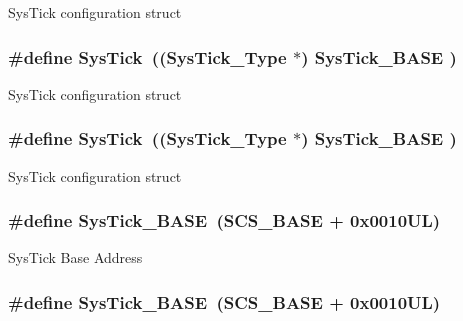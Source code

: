 Sys\-Tick configuration struct \hypertarget{group___c_m_s_i_s__core__register_gacd96c53beeaff8f603fcda425eb295de}{
\subsubsection[{Sys\-Tick}]{\setlength{\rightskip}{0pt plus 5cm}\#define Sys\-Tick~(({\bf Sys\-Tick\-\_\-\-Type}   $\ast$)     {\bf Sys\-Tick\-\_\-\-B\-A\-S\-E}  )}}\label{group___c_m_s_i_s__core__register_gacd96c53beeaff8f603fcda425eb295de}
Sys\-Tick configuration struct \hypertarget{group___c_m_s_i_s__core__register_gacd96c53beeaff8f603fcda425eb295de}{
\subsubsection[{Sys\-Tick}]{\setlength{\rightskip}{0pt plus 5cm}\#define Sys\-Tick~(({\bf Sys\-Tick\-\_\-\-Type}   $\ast$)     {\bf Sys\-Tick\-\_\-\-B\-A\-S\-E}  )}}\label{group___c_m_s_i_s__core__register_gacd96c53beeaff8f603fcda425eb295de}
Sys\-Tick configuration struct \hypertarget{group___c_m_s_i_s__core__register_ga58effaac0b93006b756d33209e814646}{
\subsubsection[{Sys\-Tick\-\_\-\-B\-A\-S\-E}]{\setlength{\rightskip}{0pt plus 5cm}\#define Sys\-Tick\-\_\-\-B\-A\-S\-E~({\bf S\-C\-S\-\_\-\-B\-A\-S\-E} +  0x0010\-U\-L)}}\label{group___c_m_s_i_s__core__register_ga58effaac0b93006b756d33209e814646}
Sys\-Tick Base Address \hypertarget{group___c_m_s_i_s__core__register_ga58effaac0b93006b756d33209e814646}{
\subsubsection[{Sys\-Tick\-\_\-\-B\-A\-S\-E}]{\setlength{\rightskip}{0pt plus 5cm}\#define Sys\-Tick\-\_\-\-B\-A\-S\-E~({\bf S\-C\-S\-\_\-\-B\-A\-S\-E} +  0x0010\-U\-L)}}\label{group___c_m_s_i_s__core__register_ga58effaac0b93006b756d33209e814646}
